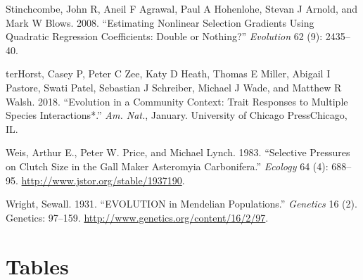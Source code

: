 \documentclass[11pt,]{article}
\begin{document}
\hypertarget{ref-Stinchcombe2008}{}
Stinchcombe, John R, Aneil F Agrawal, Paul A Hohenlohe, Stevan J Arnold,
and Mark W Blows. 2008. ``Estimating Nonlinear Selection Gradients Using
Quadratic Regression Coefficients: Double or Nothing?'' \emph{Evolution}
62 (9): 2435--40.

\hypertarget{ref-terHorst2018}{}
terHorst, Casey P, Peter C Zee, Katy D Heath, Thomas E Miller, Abigail I
Pastore, Swati Patel, Sebastian J Schreiber, Michael J Wade, and Matthew
R Walsh. 2018. ``Evolution in a Community Context: Trait Responses to
Multiple Species Interactions*.'' \emph{Am. Nat.}, January. University
of Chicago PressChicago, IL.

\hypertarget{ref-Weis1983}{}
Weis, Arthur E., Peter W. Price, and Michael Lynch. 1983. ``Selective
Pressures on Clutch Size in the Gall Maker Asteromyia Carbonifera.''
\emph{Ecology} 64 (4): 688--95.
\url{http://www.jstor.org/stable/1937190}.

\hypertarget{ref-Wright1931}{}
Wright, Sewall. 1931. ``EVOLUTION in Mendelian Populations.''
\emph{Genetics} 16 (2). Genetics: 97--159.
\url{http://www.genetics.org/content/16/2/97}.

\newpage 

\section{Tables}\label{tables}
\end{document}
